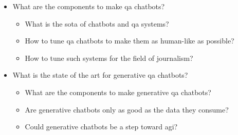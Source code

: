 \begin{itemize}[noitemsep]
    \item What are the components to make \gls{qa} chatbots?
    \begin{itemize}[noitemsep]
        \item What is the \gls{sota} of chatbots and \gls{qa} systems?
        \item How to tune \gls{qa} chatbots to make them as human-like as possible?
        \item How to tune such systems for the field of journalism?
    \end{itemize}
    \item What is the state of the art for \gls{generative} \gls{qa} chatbots?
    \begin{itemize}[noitemsep]
        \item What are the components to make \gls{generative} \gls{qa} chatbots?
        \item Are \gls{generative} chatbots only as good as the data they consume?
        \item Could \gls{generative} chatbots be a step toward \gls{agi}?
    \end{itemize}
\end{itemize}


